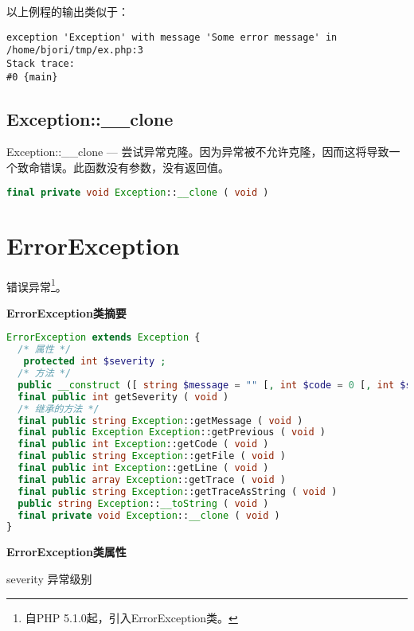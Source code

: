 以上例程的输出类似于：

\begin{verbatim}
exception 'Exception' with message 'Some error message' in /home/bjori/tmp/ex.php:3
Stack trace:
#0 {main}
\end{verbatim}


\section{Exception::\_\_clone}

Exception::\_\_clone — 尝试异常克隆。因为异常被不允许克隆，因而这将导致一个致命错误。此函数没有参数，没有返回值。

\begin{lstlisting}[language=PHP]
final private void Exception::__clone ( void )
\end{lstlisting}



\chapter{ErrorException}

错误异常\footnote{自PHP 5.1.0起，引入ErrorException类。}。

\textbf{ErrorException类摘要}



\begin{lstlisting}[language=PHP]
ErrorException extends Exception {
  /* 属性 */
   protected int $severity ;
  /* 方法 */
  public __construct ([ string $message = "" [, int $code = 0 [, int $severity = 1 [, string $filename = __FILE__ [, int $lineno = __LINE__ [, Exception $previous = NULL ]]]]]] )
  final public int getSeverity ( void )
  /* 继承的方法 */
  final public string Exception::getMessage ( void )
  final public Exception Exception::getPrevious ( void )
  final public int Exception::getCode ( void )
  final public string Exception::getFile ( void )
  final public int Exception::getLine ( void )
  final public array Exception::getTrace ( void )
  final public string Exception::getTraceAsString ( void )
  public string Exception::__toString ( void )
  final private void Exception::__clone ( void )
}
\end{lstlisting}

\textbf{ErrorException类属性}

\begin{compactitem}
\item severity
异常级别
\end{compactitem}



